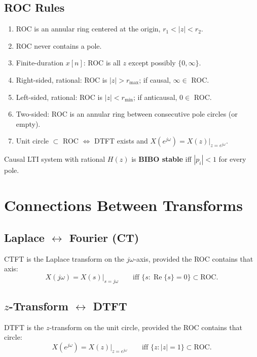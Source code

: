 \documentclass[10pt]{article}
\newcommand{\Real}{\operatorname{Re}}
\begin{document}
\subsection{ROC Rules}
\begin{enumerate}\setlength\itemsep{-2pt}
\item ROC is an annular ring centered at the origin, $r_1 < |z| < r_2$.
\item ROC never contains a pole.
\item Finite-duration $x[n]$: ROC is all $z$ except possibly $\{0,\infty\}$.
\item Right-sided, rational: ROC is $|z| > r_{\max}$; if causal, $\infty \in$ ROC.
\item Left-sided, rational: ROC is $|z| < r_{\min}$; if anticausal, $0 \in$ ROC.
\item Two-sided: ROC is an annular ring between consecutive pole circles (or empty).
\item Unit circle $\subset$ ROC $\iff$ DTFT exists and $X(e^{j\omega}) = X(z)|_{z = e^{j\omega}}$.
\end{enumerate}
Causal LTI system with rational $H(z)$ is \textbf{BIBO stable} iff $|p_i| < 1$ for every pole.

\section{Connections Between Transforms}

\subsection{Laplace $\leftrightarrow$ Fourier (CT)}
CTFT is the Laplace transform on the $j\omega$-axis, provided the ROC contains that axis:
\[
X(j\omega) = X(s)\big|_{s = j\omega}\qquad \text{iff }\{s:\Real\{s\}=0\}\subset\text{ROC}.
\]

\subsection{$z$-Transform $\leftrightarrow$ DTFT}
DTFT is the $z$-transform on the unit circle, provided the ROC contains that circle:
\[
X(e^{j\omega}) = X(z)\big|_{z = e^{j\omega}}\qquad \text{iff }\{z:|z|=1\}\subset\text{ROC}.
\]
\end{document}
